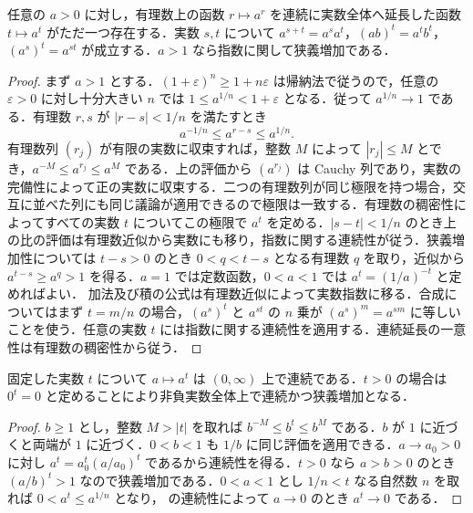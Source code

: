 \begin{prop}[正実数の実指数冪]
任意の $a>0$ に対し，有理数上の函数 $r\mapsto a^r$ を連続に実数全体へ延長した函数 $t\mapsto a^t$ がただ一つ存在する．実数 $s,t$ について $a^{s+t}=a^sa^t$，$(ab)^t=a^tb^t$，$(a^s)^t=a^{st}$ が成立する．$a>1$ なら指数に関して狭義増加である．
\end{prop}
\begin{proof}
まず $a>1$ とする．$(1+\varepsilon)^n\geq1+n\varepsilon$ は帰納法で従うので，任意の $\varepsilon>0$ に対し十分大きい $n$ では $1\leq a^{1/n}<1+\varepsilon$ となる．従って $a^{1/n}\to1$ である．有理数 $r,s$ が $|r-s|<1/n$ を満たすとき
\[
a^{-1/n}\leq a^{r-s}\leq a^{1/n}.
\]
有理数列 $(r_j)$ が有限の実数に収束すれば，整数 $M$ によって $|r_j|\leq M$ とでき，$a^{-M}\leq a^{r_j}\leq a^M$ である．上の評価から $(a^{r_j})$ は Cauchy 列であり，実数の完備性によって正の実数に収束する．二つの有理数列が同じ極限を持つ場合，交互に並べた列にも同じ議論が適用できるので極限は一致する．有理数の稠密性によってすべての実数 $t$ についてこの極限で $a^t$ を定める．$|s-t|<1/n$ のとき上の比の評価は有理数近似から実数にも移り，指数に関する連続性が従う．狭義増加性については $t-s>0$ のとき $0<q<t-s$ となる有理数 $q$ を取り，近似から $a^{t-s}\geq a^q>1$ を得る．$a=1$ では定数函数，$0<a<1$ では $a^t=(1/a)^{-t}$ と定めればよい．
加法及び積の公式は有理数近似によって実数指数に移る．合成についてはまず $t=m/n$ の場合，$(a^s)^t$ と $a^{st}$ の $n$ 乗が $(a^s)^m=a^{sm}$ に等しいことを使う．任意の実数 $t$ には指数に関する連続性を適用する．連続延長の一意性は有理数の稠密性から従う．
\end{proof}
\begin{prop}[底に関する実指数冪の連続性]
固定した実数 $t$ について $a\mapsto a^t$ は $(0,\infty)$ 上で連続である．$t>0$ の場合は $0^t=0$ と定めることにより非負実数全体上で連続かつ狭義増加となる．
\end{prop}
\begin{proof}
$b\geq1$ とし，整数 $M>|t|$ を取れば $b^{-M}\leq b^t\leq b^M$ である．$b$ が $1$ に近づくと両端が $1$ に近づく．$0<b<1$ も $1/b$ に同じ評価を適用できる．$a\to a_0>0$ に対し $a^t=a_0^t(a/a_0)^t$ であるから連続性を得る．$t>0$ なら $a>b>0$ のとき $(a/b)^t>1$ なので狭義増加である．$0<a<1$ とし $1/n<t$ なる自然数 $n$ を取れば $0<a^t\leq a^{1/n}$ となり， の連続性によって $a\to0$ のとき $a^t\to0$ である．
\end{proof}
